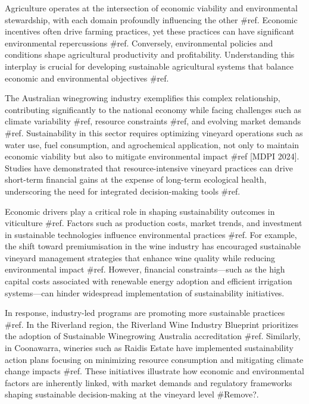 \documentclass{article}
\begin{document}







Agriculture operates at the intersection of economic viability and environmental stewardship, with each domain profoundly influencing the other #ref. Economic incentives often drive farming practices, yet these practices can have significant environmental repercussions #ref. Conversely, environmental policies and conditions shape agricultural productivity and profitability. Understanding this interplay is crucial for developing sustainable agricultural systems that balance economic and environmental objectives #ref.

The Australian winegrowing industry exemplifies this complex relationship, contributing significantly to the national economy while facing challenges such as climate variability #ref, resource constraints #ref, and evolving market demands #ref. Sustainability in this sector requires optimizing vineyard operations such as water use, fuel consumption, and agrochemical application, not only to maintain economic viability but also to mitigate environmental impact #ref [MDPI 2024]. Studies have demonstrated that resource-intensive vineyard practices can drive short-term financial gains at the expense of long-term ecological health, underscoring the need for integrated decision-making tools #ref.

Economic drivers play a critical role in shaping sustainability outcomes in viticulture #ref. Factors such as production costs, market trends, and investment in sustainable technologies influence environmental practices #ref. For example, the shift toward premiumisation in the wine industry has encouraged sustainable vineyard management strategies that enhance wine quality while reducing environmental impact #ref. However, financial constraints—such as the high capital costs associated with renewable energy adoption and efficient irrigation systems—can hinder widespread implementation of sustainability initiatives.

In response, industry-led programs are promoting more sustainable practices #ref. In the Riverland region, the Riverland Wine Industry Blueprint prioritizes the adoption of Sustainable Winegrowing Australia accreditation #ref. Similarly, in Coonawarra, wineries such as Raidis Estate have implemented sustainability action plans focusing on minimizing resource consumption and mitigating climate change impacts #ref. These initiatives illustrate how economic and environmental factors are inherently linked, with market demands and regulatory frameworks shaping sustainable decision-making at the vineyard level #Remove?.
\end{document}
